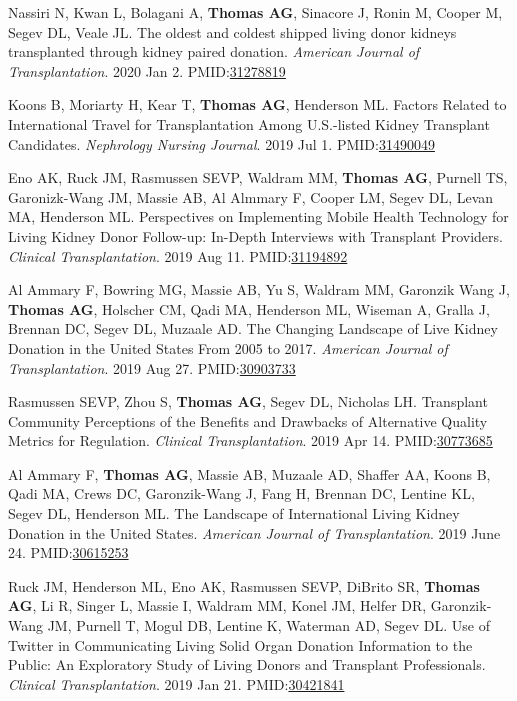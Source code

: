 \documentclass[10pt]{article}
\makeatletter
\newlength{\bibhang}
\newlength{\bibsep}
 {\@listi \global\bibsep\itemsep \global\advance\bibsep by\parsep}
\newenvironment{bibenum*}
  {\renewcommand\labelenumi{[\theenumi]}%
   \etaremune[
     topsep=0pt,
     itemsep=\bibsep,
     parsep=0pt,partopsep=0pt,
     itemindent=-\bibhang,
     leftmargin={\bibhang+\widthof{[999]}}]}
  {\endetaremune}
\newcommand{\pmid}[1]{PMID:\href{https://www.ncbi.nlm.nih.gov/pubmed/#1}{#1}}
\makeatother
\begin{document}
\begin{bibenum*}
\item Nassiri N, Kwan L, Bolagani A, \textbf{Thomas AG}, Sinacore J, Ronin M,
  Cooper M, Segev DL, Veale JL.
  The oldest and coldest shipped living donor kidneys transplanted
  through kidney paired donation.
  \emph{American Journal of Transplantation}. 2020 Jan 2.
  \pmid{31278819} 

\item Koons B, Moriarty H, Kear T, \textbf{Thomas AG}, Henderson ML.
  Factors Related to International Travel for Transplantation Among U.S.-listed
  Kidney Transplant Candidates.
  \emph{Nephrology Nursing Journal}. 2019 Jul 1.
  \pmid{31490049} %

\item Eno AK, Ruck JM, Rasmussen SEVP, Waldram MM, \textbf{Thomas AG},
  Purnell TS, Garonizk-Wang JM, Massie AB, Al Almmary F, Cooper LM,
  Segev DL, Levan MA, Henderson ML.
  Perspectives on Implementing Mobile Health Technology for Living Kidney
  Donor Follow-up: In-Depth Interviews with Transplant Providers.
  \emph{Clinical Transplantation}. 2019 Aug 11.
  \pmid{31194892} 

\item Al Ammary F, Bowring MG, Massie AB, Yu S, Waldram MM, Garonzik Wang J,
  \textbf{Thomas AG}, Holscher CM, Qadi MA, Henderson ML, Wiseman A,
  Gralla J, Brennan DC, Segev DL, Muzaale AD.
  The Changing Landscape of Live Kidney Donation in the United States
  From 2005 to 2017.
  \emph{American Journal of Transplantation}. 2019 Aug 27.
  \pmid{30903733} 

\item Rasmussen SEVP, Zhou S, \textbf{Thomas AG},
  Segev DL, Nicholas LH.
  Transplant Community Perceptions of the Benefits and Drawbacks of
  Alternative Quality Metrics for Regulation.
  \emph{Clinical Transplantation}. 2019 Apr 14.
  \pmid{30773685} 

\item Al Ammary F\dag, \textbf{Thomas AG\dag}, Massie AB, Muzaale AD,
  Shaffer AA, Koons B, Qadi MA, Crews DC, Garonzik-Wang J,
  Fang H, Brennan DC, Lentine KL, Segev DL, Henderson ML.
  The Landscape of International Living Kidney Donation in the United States.
  \emph{American Journal of Transplantation}. 2019 June 24.
  \pmid{30615253} 

\item Ruck JM\dag, Henderson ML\dag, Eno AK, Rasmussen SEVP,
  DiBrito SR, \textbf{Thomas AG}, Li R, Singer L, Massie I, Waldram MM,
  Konel JM, Helfer DR, Garonzik-Wang JM, Purnell T,
  Mogul DB, Lentine K, Waterman AD, Segev DL.
  Use of Twitter in Communicating Living Solid Organ Donation Information
  to the Public: An Exploratory Study of Living Donors and
  Transplant Professionals.
  \emph{Clinical Transplantation}. 2019 Jan 21.
  \pmid{30421841} 


\end{bibenum*}
\end{document}
